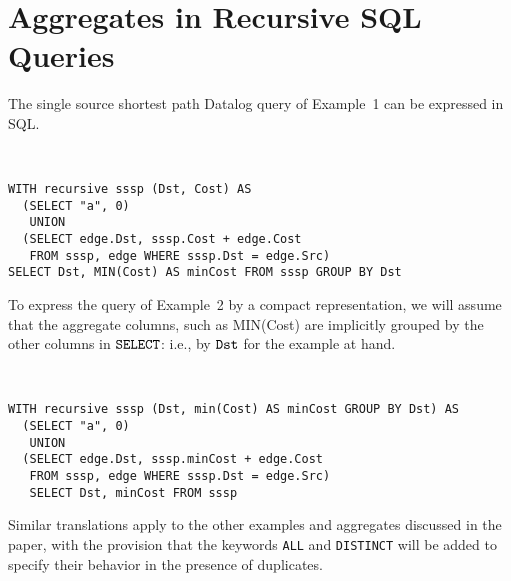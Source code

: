 \documentclass[11pt]{article}
\begin{document}
\appendix
\section{Aggregates in Recursive  SQL Queries}

The  single source shortest path  Datalog query of Example~1 can be expressed in SQL.

\begin{example}
\label{ex:apsp}

~

\begin{verbatim}
WITH recursive sssp (Dst, Cost) AS
  (SELECT "a", 0)
   UNION
  (SELECT edge.Dst, sssp.Cost + edge.Cost
   FROM sssp, edge WHERE sssp.Dst = edge.Src)
SELECT Dst, MIN(Cost) AS minCost FROM sssp GROUP BY Dst
\end{verbatim}
\end{example}
\noindent
To express the query of Example~2 by a compact representation, 
we will assume that the aggregate columns, such as MIN(Cost) are implicitly
grouped by the other columns  in  $\tt SELECT $: i.e., by $\tt Dst$ for the example at hand.

\begin{example}

~
\begin{verbatim}
WITH recursive sssp (Dst, min(Cost) AS minCost GROUP BY Dst) AS
  (SELECT "a", 0)
   UNION
  (SELECT edge.Dst, sssp.minCost + edge.Cost
   FROM sssp, edge WHERE sssp.Dst = edge.Src)
   SELECT Dst, minCost FROM sssp 
\end{verbatim}
\end{example}

Similar translations apply to the other  examples and aggregates discussed in the paper, with the provision 
that the keywords {\tt ALL} and {\tt DISTINCT} will
be added to specify their behavior in the presence of duplicates.
\end{document}
